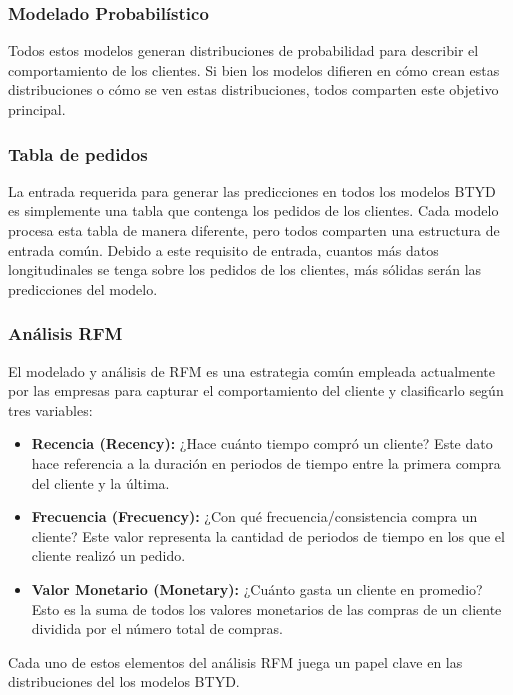 \subsubsection{Modelado Probabilístico}

Todos estos modelos generan distribuciones de probabilidad para describir el comportamiento de los clientes. Si bien los modelos difieren en cómo crean estas distribuciones o cómo se ven estas distribuciones, todos comparten este objetivo principal.

\subsubsection{Tabla de pedidos}

La entrada requerida para generar las predicciones en todos los modelos BTYD es simplemente una tabla que contenga los pedidos de los clientes.  Cada modelo procesa esta tabla de manera diferente, pero todos comparten una estructura de entrada común. Debido a este requisito de entrada, cuantos más datos longitudinales se tenga sobre los pedidos de los clientes, más sólidas serán las predicciones del modelo.

\subsubsection{Análisis RFM}

 El modelado y análisis de RFM es una estrategia común empleada actualmente por las empresas para capturar el comportamiento del cliente y clasificarlo según tres variables: 
 
\begin{itemize}
	\item \textbf{Recencia (Recency):} ¿Hace cuánto tiempo compró un cliente? Este dato hace referencia a la duración en periodos de tiempo entre la primera compra del cliente y la última.	
	\item \textbf{Frecuencia (Frecuency):} ¿Con qué frecuencia/consistencia compra un cliente? Este valor representa la cantidad de periodos de tiempo en los que el cliente realizó un pedido.
	\item \textbf{Valor Monetario (Monetary):} ¿Cuánto gasta un cliente en promedio? Esto es la suma de todos los valores monetarios de las compras de un cliente dividida por el número total de compras.
\end{itemize}

Cada uno de estos elementos del análisis RFM juega un papel clave en las distribuciones del los modelos BTYD. 

